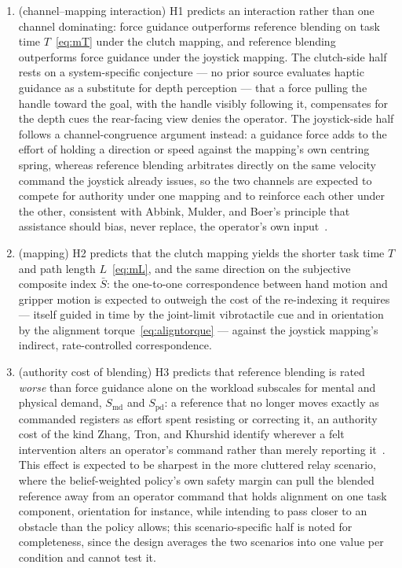 \begin{enumerate}[nosep, label=\textbf{H\arabic*.}]
\item (channel--mapping interaction) H1 predicts an interaction rather than one channel dominating: force guidance outperforms reference blending on task time $T$~\eqref{eq:mT} under the clutch mapping, and reference blending outperforms force guidance under the joystick mapping. The clutch-side half rests on a system-specific conjecture --- no prior source evaluates haptic guidance as a substitute for depth perception --- that a force pulling the handle toward the goal, with the handle visibly following it, compensates for the depth cues the rear-facing view denies the operator. The joystick-side half follows a channel-congruence argument instead: a guidance force adds to the effort of holding a direction or speed against the mapping's own centring spring, whereas reference blending arbitrates directly on the same velocity command the joystick already issues, so the two channels are expected to compete for authority under one mapping and to reinforce each other under the other, consistent with Abbink, Mulder, and Boer's principle that assistance should bias, never replace, the operator's own input~\cite{abbink2012hapticshared}.
\item (mapping) H2 predicts that the clutch mapping yields the shorter task time $T$ and path length $L$~\eqref{eq:mL}, and the same direction on the subjective composite index $\bar{S}$: the one-to-one correspondence between hand motion and gripper motion is expected to outweigh the cost of the re-indexing it requires --- itself guided in time by the joint-limit vibrotactile cue and in orientation by the alignment torque~\eqref{eq:aligntorque} --- against the joystick mapping's indirect, rate-controlled correspondence.
\item (authority cost of blending) H3 predicts that reference blending is rated \emph{worse} than force guidance alone on the workload subscales for mental and physical demand, $S_{\mathrm{md}}$ and $S_{\mathrm{pd}}$: a reference that no longer moves exactly as commanded registers as effort spent resisting or correcting it, an authority cost of the kind Zhang, Tron, and Khurshid identify wherever a felt intervention alters an operator's command rather than merely reporting it~\cite{zhang2021hapticagreement}. This effect is expected to be sharpest in the more cluttered relay scenario, where the belief-weighted policy's own safety margin can pull the blended reference away from an operator command that holds alignment on one task component, orientation for instance, while intending to pass closer to an obstacle than the policy allows; this scenario-specific half is noted for completeness, since the design averages the two scenarios into one value per condition and cannot test it.

\end{enumerate}
